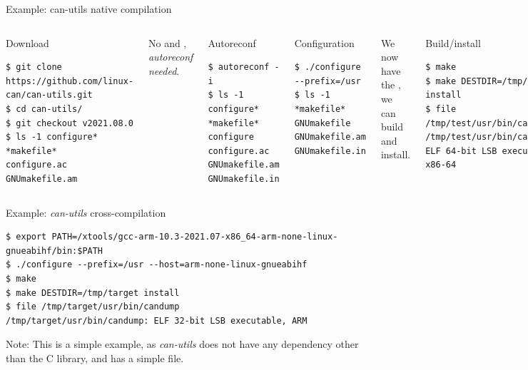 \begin{frame}[fragile]{Example: can-utils native compilation}
  \begin{columns}
  \begin{block}{Download}
    {\tiny
\begin{verbatim}
$ git clone https://github.com/linux-can/can-utils.git
$ cd can-utils/
$ git checkout v2021.08.0
$ ls -1 configure* *makefile*
configure.ac
GNUmakefile.am
\end{verbatim}
    }
  \end{block}

  {\small No  and
    , {\em autoreconf needed}.}

  \begin{block}{Autoreconf}
    {\tiny
\begin{verbatim}
$ autoreconf -i
$ ls -1 configure* *makefile*
configure
configure.ac
GNUmakefile.am
GNUmakefile.in
\end{verbatim}
    }
  \end{block}


  \begin{block}{Configuration}
    {\tiny
\begin{verbatim}
$ ./configure --prefix=/usr
$ ls -1 *makefile*
GNUmakefile
GNUmakefile.am
GNUmakefile.in
\end{verbatim}
    }
  \end{block}

  {\small We now have the , we can build and install.}

  \begin{block}{Build/install}
    {\tiny
\begin{verbatim}
$ make
$ make DESTDIR=/tmp/test install
$ file /tmp/test/usr/bin/candump
/tmp/test/usr/bin/candump: ELF 64-bit LSB executable, x86-64
\end{verbatim}
    }
  \end{block}

\end{columns}
\end{frame}

\begin{frame}[fragile]{Example: {\em can-utils} cross-compilation}
  \begin{block}{}
    {\scriptsize
\begin{verbatim}
$ export PATH=/xtools/gcc-arm-10.3-2021.07-x86_64-arm-none-linux-gnueabihf/bin:$PATH
$ ./configure --prefix=/usr --host=arm-none-linux-gnueabihf
$ make
$ make DESTDIR=/tmp/target install
$ file /tmp/target/usr/bin/candump
/tmp/target/usr/bin/candump: ELF 32-bit LSB executable, ARM
\end{verbatim}
    }
    \end{block}

    Note: This is a simple example, as {\em can-utils} does not have
    any dependency other than the C library, and has a simple
     file.
\end{frame}

